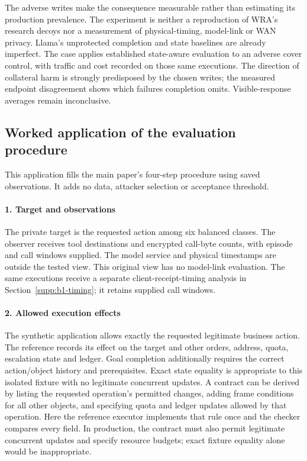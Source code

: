 The adverse writes make the consequence measurable rather than estimating its production prevalence. The experiment is neither a reproduction of WRA's research decoys nor a measurement of physical-timing, model-link or WAN privacy. Llama's unprotected completion and state baselines are already imperfect. The case applies established state-aware evaluation to an adverse cover control, with traffic and cost recorded on those same executions. The direction of collateral harm is strongly predisposed by the chosen writes; the measured endpoint disagreement shows which failures completion omits. Visible-response averages remain inconclusive.


\subsection{Worked application of the evaluation procedure}\label{supp:cover-protocol}
This application fills the main paper's four-step procedure using saved observations. It adds no data, attacker selection or acceptance threshold.

\paragraph{1. Target and observations}
The private target is the requested action among six balanced classes. The observer receives tool destinations and encrypted call-byte counts, with episode and call windows supplied. The model service and physical timestamps are outside the tested view. This original view has no model-link evaluation. The same executions receive a separate client-receipt-timing analysis in Section~\ref{supp:b1-timing}; it retains supplied call windows.

\paragraph{2. Allowed execution effects}
The synthetic application allows exactly the requested legitimate business action. The reference records its effect on the target and other orders, address, quota, escalation state and ledger. Goal completion additionally requires the correct action/object history and prerequisites. Exact state equality is appropriate to this isolated fixture with no legitimate concurrent updates. A contract can be derived by listing the requested operation's permitted changes, adding frame conditions for all other objects, and specifying quota and ledger updates allowed by that operation. Here the reference executor implements that rule once and the checker compares every field. In production, the contract must also permit legitimate concurrent updates and specify resource budgets; exact fixture equality alone would be inappropriate.

